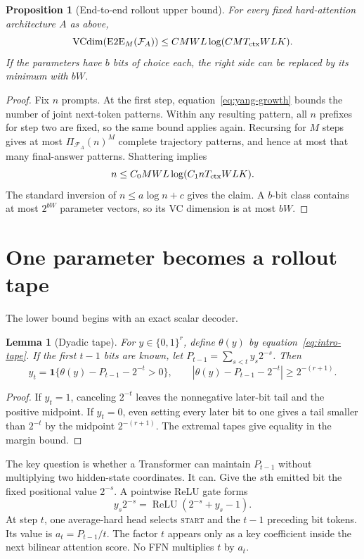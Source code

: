 \documentclass{article}
\newtheorem{proposition}[theorem]{Proposition}
\newtheorem{lemma}[theorem]{Lemma}
\newcommand{\1}{\mathbf 1}
\newcommand{\VC}{\operatorname{VCdim}}
\newcommand{\EtoE}{\operatorname{E2E}}
\begin{document}
\begin{proposition}[End-to-end rollout upper bound]\label{prop:upper}
For every fixed hard-attention architecture $A$ as above, \[ \VC(\EtoE_M(\mathcal F_A)) \leq CMWL\log(CMT_{\rm ctx}WLK). \] If the parameters have $b$ bits of choice each, the right side can be replaced by its minimum with $bW$.
\end{proposition}

\begin{proof}
Fix $n$ prompts. At the first step, equation~\eqref{eq:yang-growth} bounds the number of joint next-token patterns. Within any resulting pattern, all $n$ prefixes for step two are fixed, so the same bound applies again. Recursing for $M$ steps gives at most $\Pi_{\mathcal F_A}(n)^M$ complete trajectory patterns, and hence at most that many final-answer patterns. Shattering implies \[ n\leq C_0MWL\log(C_1nT_{\rm ctx}WLK). \] The standard inversion of $n\leq a\log n+c$ gives the claim. A $b$-bit class contains at most $2^{bW}$ parameter vectors, so its VC dimension is at most $bW$.
\end{proof}

\section{One parameter becomes a rollout tape}

The lower bound begins with an exact scalar decoder.

\begin{lemma}[Dyadic tape]\label{lem:tape}
For $y\in\{0,1\}^r$, define $\theta(y)$ by equation~\eqref{eq:intro-tape}. If the first $t-1$ bits are known, let $P_{t-1}=\sum_{s<t}y_s2^{-s}$. Then
\begin{equation}
 y_t=\1\{\theta(y)-P_{t-1}-2^{-t}>0\},
 \qquad
 \left|\theta(y)-P_{t-1}-2^{-t}\right|\geq2^{-(r+1)}.
 \label{eq:tape-decode}
\end{equation}
\end{lemma}

\begin{proof}
If $y_t=1$, canceling $2^{-t}$ leaves the nonnegative later-bit tail and the positive midpoint. If $y_t=0$, even setting every later bit to one gives a tail smaller than $2^{-t}$ by the midpoint $2^{-(r+1)}$. The extremal tapes give equality in the margin bound.
\end{proof}

The key question is whether a Transformer can maintain $P_{t-1}$ without multiplying two hidden-state coordinates. It can. Give the $s$th emitted bit the fixed positional value $2^{-s}$. A pointwise ReLU gate forms
\begin{equation}
 y_s2^{-s}=\operatorname{ReLU}(2^{-s}+y_s-1).
 \label{eq:relu-product}
\end{equation}
At step $t$, one average-hard head selects \textsc{start} and the $t-1$ preceding bit tokens. Its value is $a_t=P_{t-1}/t$. The factor $t$ appears only as a key coefficient inside the next bilinear attention score. No FFN multiplies $t$ by $a_t$.
\end{document}
